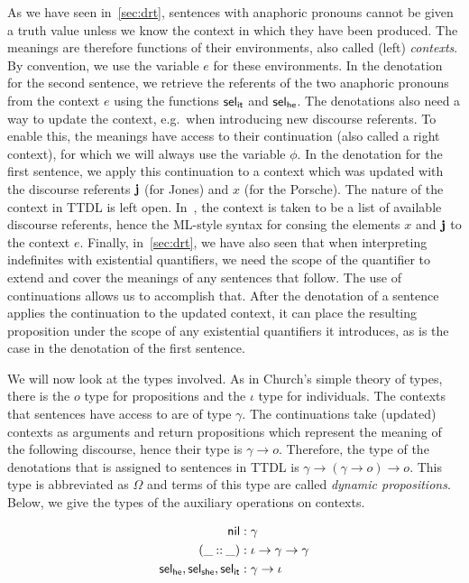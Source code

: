 As we have seen in~\ref{sec:drt}, sentences with anaphoric pronouns cannot
be given a truth value unless we know the context in which they have been
produced. The meanings are therefore functions of their environments, also
called (left) \emph{contexts}. By convention, we use the variable $e$ for
these environments. In the denotation for the second sentence, we retrieve
the referents of the two anaphoric pronouns from the context $e$ using the
functions $\mathsf{sel}_{\mathsf{it}}$ and $\mathsf{sel}_{\mathsf{he}}$. The denotations also need a way to update
the context, e.g.\ when introducing new discourse referents. To enable
this, the meanings have access to their continuation (also called a right
context), for which we will always use the variable $\phi$. In the
denotation for the first sentence, we apply this continuation to a context
which was updated with the discourse referents $\textbf{j}$ (for Jones) and
$x$ (for the Porsche). The nature of the context in TTDL is left
open. In~\cite{de2006towards}, the context is taken to be a list of
available discourse referents, hence the ML-style syntax for consing the
elements $x$ and $\textbf{j}$ to the context $e$. Finally, in~\ref{sec:drt},
we have also seen that when interpreting indefinites with existential
quantifiers, we need the scope of the quantifier to extend and cover the
meanings of any sentences that follow. The use of continuations allows us
to accomplish that. After the denotation of a sentence applies the
continuation to the updated context, it can place the resulting proposition
under the scope of any existential quantifiers it introduces, as is the
case in the denotation of the first sentence.

We will now look at the types involved. As in Church's simple theory of
types, there is the $o$ type for propositions and the $\iota$ type for
individuals. The contexts that sentences have access to are of type
$\gamma$. The continuations take (updated) contexts as arguments and return
propositions which represent the meaning of the following discourse, hence
their type is $\gamma \to o$. Therefore, the type of the denotations that
is assigned to sentences in TTDL is $\gamma \to (\gamma \to o) \to o$. This
type is abbreviated as $\Omega$ and terms of this type are called
\emph{dynamic propositions}. Below, we give the types of the auxiliary
operations on contexts.

\begin{align*}
  \mathsf{nil} &: \gamma \\
  (\_ \mathbin{::} \_) &: \iota \to \gamma \to \gamma \\
  \mathsf{sel}_{\mathsf{he}}, \mathsf{sel}_{\mathsf{she}}, \mathsf{sel}_{\mathsf{it}} &: \gamma \to \iota
\end{align*}

